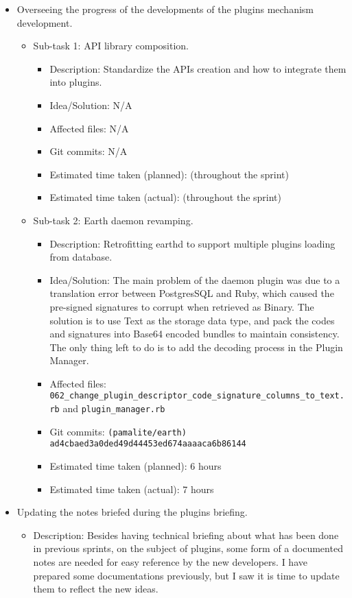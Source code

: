 \begin{itemize}
	\item Overseeing the progress of the developments of the plugins mechanism development.
	     \begin{itemize}
	        \item Sub-task 1: API library composition.
	           \begin{itemize}
					\item Description: Standardize the APIs creation and how to integrate them into plugins.
					\item Idea/Solution: N/A
					\item Affected files: N/A
					\item Git commits: N/A
					\item Estimated time taken (planned): (throughout the sprint)
					\item Estimated time taken (actual): (throughout the sprint)
				\end{itemize}
			\item Sub-task 2: Earth daemon revamping.
			   \begin{itemize}
					\item Description: Retrofitting earthd to support multiple plugins loading from database. 
					\item Idea/Solution: The main problem of the daemon plugin was due to a translation error between PostgresSQL and Ruby, which caused the pre-signed signatures to corrupt when retrieved as Binary. The solution is to use Text as the storage data type, and pack the codes and signatures into Base64 encoded bundles to maintain consistency. The only thing left to do is to add the decoding process in the Plugin Manager.  
					\item Affected files: \texttt{062\_change\_plugin\_descriptor\_code\_signature\_columns\_to\_text.rb} and \texttt{plugin\_manager.rb}
					\item Git commits: \texttt{(pamalite/earth) ad4cbaed3a0ded49d44453ed674aaaaca6b86144}
					\item Estimated time taken (planned): 6 hours
					\item Estimated time taken (actual): 7 hours
				\end{itemize}
	     \end{itemize}
	\item Updating the notes briefed during the plugins briefing.
	     \begin{itemize}
	         \item Description: Besides having technical briefing about what has been done in previous sprints, on  the subject of plugins, some form of a documented notes are needed for easy reference by the new developers. I have prepared some documentations previously, but I saw it is time to update them to reflect the new ideas.  

\end{itemize}
\end{itemize}
